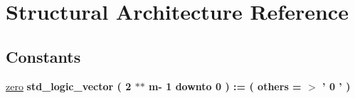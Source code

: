 \hypertarget{class_r_m_encoder_1_1_structural}{\section{Structural Architecture Reference}
\label{class_r_m_encoder_1_1_structural}
}
\subsection*{Constants}
 \begin{DoxyCompactItemize}
\item 
\hypertarget{class_r_m_encoder_1_1_structural_gaa60d5ca93133573b9fb3e8cc51520aa1}{\hyperlink{group___r_m_encoder_gaa60d5ca93133573b9fb3e8cc51520aa1}{zero} {\bfseries \textcolor{comment}{std\+\_\+logic\+\_\+vector}\textcolor{vhdlchar}{ }\textcolor{vhdlchar}{(}\textcolor{vhdlchar}{ }\textcolor{vhdlchar}{ } \textcolor{vhdldigit}{2} \textcolor{vhdlchar}{$\ast$}\textcolor{vhdlchar}{$\ast$}\textcolor{vhdlchar}{ }\textcolor{vhdlchar}{ }\textcolor{vhdlchar}{ }\textcolor{vhdlchar}{m}\textcolor{vhdlchar}{-\/}\textcolor{vhdlchar}{ } \textcolor{vhdldigit}{1} \textcolor{vhdlchar}{ }\textcolor{keywordflow}{downto}\textcolor{vhdlchar}{ }\textcolor{vhdlchar}{ } \textcolor{vhdldigit}{0} \textcolor{vhdlchar}{ }\textcolor{vhdlchar}{)}\textcolor{vhdlchar}{ }\textcolor{vhdlchar}{ }\textcolor{vhdlchar}{ }\textcolor{vhdlchar}{\+:}\textcolor{vhdlchar}{=}\textcolor{vhdlchar}{ }\textcolor{vhdlchar}{(}\textcolor{vhdlchar}{ }\textcolor{vhdlchar}{ }\textcolor{keywordflow}{others}\textcolor{vhdlchar}{ }\textcolor{vhdlchar}{ }\textcolor{vhdlchar}{=}\textcolor{vhdlchar}{ }\textcolor{vhdlchar}{$>$}\textcolor{vhdlchar}{ }\textcolor{vhdlchar}{'}\textcolor{vhdlchar}{ } \textcolor{vhdldigit}{0} \textcolor{vhdlchar}{ }\textcolor{vhdlchar}{'}\textcolor{vhdlchar}{ }\textcolor{vhdlchar}{)}\textcolor{vhdlchar}{ }} }\label{class_r_m_encoder_1_1_structural_gaa60d5ca93133573b9fb3e8cc51520aa1}

\end{DoxyCompactItemize}
